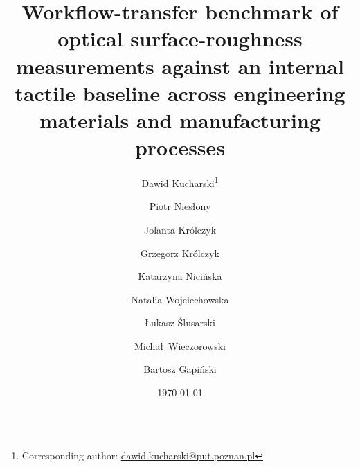 \documentclass{article}
\begin{document}
	\title{Workflow-transfer benchmark of optical surface-roughness measurements against an internal tactile baseline across engineering materials and manufacturing processes}
\author[1]{Dawid Kucharski\thanks{Corresponding author: \href{mailto:dawid.kucharski@put.poznan.pl}{dawid.kucharski@put.poznan.pl}}}
\author[2]{Piotr Nies\l ony}
\author[3]{Jolanta Kr\'olczyk}
\author[4]{Grzegorz Kr\'olczyk}
\author[5]{Katarzyna Nici\'nska}
\author[5]{Natalia Wojciechowska}
\author[5]{{\L}ukasz {\'S}lusarski}
\author[1]{Micha\l\ Wieczorowski}
\author[1]{Bartosz Gapi\'nski}
\vspace{-5mm}
\date{\today\\\vspace{2mm}}
\maketitle
\onehalfspacing
\linenumbers
\end{document}

